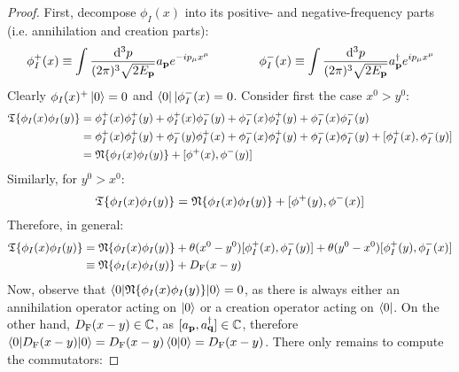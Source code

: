\begin{proofbox}
  \begin{proof}
    First, decompose $ \phi_I(x) $ into its positive- and negative-frequency parts (i.e. annihilation and creation parts):
    \begin{equation*}
      \phi_I^+(x) \equiv \int \frac{\mathrm{d}^3p}{(2\pi)^3 \sqrt{2E_{\mathbf{p}}}} a_{\mathbf{p}} e^{-i p_\mu x^\mu}
      \qquad \qquad
      \phi_I^-(x) \equiv \int \frac{\mathrm{d}^3p}{(2\pi)^3 \sqrt{2E_{\mathbf{p}}}} a_{\mathbf{p}}^\dagger e^{i p_\mu x^\mu}
    \end{equation*}
    Clearly $ \phi_I(x)^+ \ket{0} = 0 $ and $ \bra{0} | \phi_I^-(x) = 0 $. Consider first the case $ x^0 > y^0 $:
    \begin{equation*}
      \begin{split}
        \mathfrak{T}\{\phi_I(x) \phi_I(y)\}
        & = \phi_I^+(x) \phi_I^+(y) + \phi_I^+(x) \phi_I^-(y) + \phi_I^-(x) \phi_I^+(y) + \phi_I^-(x) \phi_I^-(y) \\
        & = \phi_I^+(x) \phi_I^+(y) + \phi_I^-(y) \phi_I^+(x) + \phi_I^-(x) \phi_I^+(y) + \phi_I^-(x) \phi_I^-(y) + [\phi_I^+(x) , \phi_I^-(y)] \\
        & = \mathfrak{N}\{\phi_I(x) \phi_I(y)\} + [\phi^+(x) , \phi^-(y)]
      \end{split}
    \end{equation*}
    Similarly, for $ y^0 > x^0 $:
    \begin{equation*}
      \mathfrak{T}\{\phi_I(x) \phi_I(y)\} = \mathfrak{N}\{\phi_I(x) \phi_I(y)\} + [\phi^+(y) , \phi^-(x)]
    \end{equation*}
    Therefore, in general:
    \begin{equation*}
      \begin{split}
        \mathfrak{T}\{\phi_I(x) \phi_I(y)\}
        & = \mathfrak{N}\{\phi_I(x) \phi_I(y)\} + \theta(x^0 - y^0) [\phi_I^+(x) , \phi_I^-(y)] + \theta(y^0 - x^0) [\phi_I^+(y) , \phi_I^-(x)] \\
        & \equiv \mathfrak{N}\{\phi_I(x) \phi_I(y)\} + D_\text{F}(x-y)
      \end{split}
    \end{equation*}
    Now, observe that $ \braket{0 | \mathfrak{N}\{\phi_I(x) \phi_I(y)\} | 0} = 0 $, as there is always either an annihilation operator acting on $ \ket{0} $ or a creation operator acting on $ \bra{0} $. On the other hand, $ D_\text{F}(x-y) \in \mathbb{C} $, as $ [a_{\mathbf{p}} , a^\dagger_{\mathbf{q}}] \in \mathbb{C} $, therefore $ \braket{0 | D_\text{F}(x-y) | 0} = D_\text{F}(x-y) \braket{0 | 0} = D_\text{F}(x-y) $. There only remains to compute the commutators:

\end{proof}
\end{proofbox}
